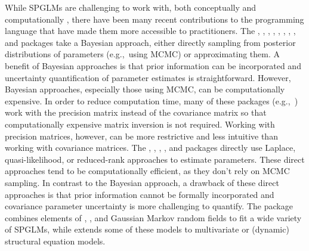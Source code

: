 \documentclass[
]{jss}
\begin{document}
While SPGLMs are challenging to work with, both conceptually and
computationally \citep{bolker2009generalized}, there have been many
recent contributions to the  programming language
\citep{rcore2026} that have made them more accessible to practitioners.
The  \citep{burkner2017brms}, 
\citep{lee2013carbayes},  \citep{hughes2020ngspatial},
 \citep{lindgren2015bayesian}, 
\citep{bachl2019inlabru},  \citep{finley2007spbayes},
 \citep{doser2022spoccupancy}, 
\citep{doser2024spabundance}, and  \citep{finley2002spnngp}
packages take a Bayesian approach, either directly sampling from
posterior distributions of parameters (e.g.,~using MCMC) or
approximating them. A benefit of Bayesian approaches is that prior
information can be incorporated and uncertainty quantification of
parameter estimates is straightforward. However, Bayesian approaches,
especially those using MCMC, can be computationally expensive. In order
to reduce computation time, many of these packages (e.g.,~)
work with the precision matrix instead of the covariance matrix so that
computationally expensive matrix inversion is not required. Working with
precision matrices, however, can be more restrictive and less intuitive
than working with covariance matrices. The 
\citep{sainsbury2024modeling},  \citep{brooks2017glmmtmb},
 \citep{ronnegard2010hglm}, 
\citep{wood2017generalized}, and  \citep{rousset2014spamm}
packages directly use Laplace, quasi-likelihood, or reduced-rank
approaches to estimate parameters. These direct approaches tend to be
computationally efficient, as they don't rely on MCMC sampling. In
contrast to the Bayesian approach, a drawback of these direct approaches
is that prior information cannot be formally incorporated and covariance
parameter uncertainty is more challenging to quantify. The 
\citep{anderson2025sdmtmb} package combines elements of ,
, and Gaussian Markov random fields to fit a wide variety
of SPGLMs, while  \citep{thorson2025tinyVAST} extends some
of these models to multivariate or (dynamic) structural equation models.
\end{document}
